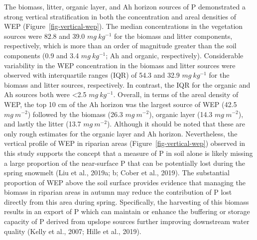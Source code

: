 \documentclass[
]{agujournal2019}
\begin{document}
The biomass, litter, organic layer, and Ah horizon sources of P
demonstrated a strong vertical stratification in both the concentration
and areal densities of WEP (Figure~\ref{fig-vertical-wep}). The median
concentrations in the vegetation sources were 82.8 and 39.0
\(mg~kg^{-1}\) for the biomass and litter components, respectively,
which is more than an order of magnitude greater than the soil
components (0.9 and 3.4 \(mg~kg^{-1}\); Ah and organic, respectively).
Considerable variability in the WEP concentration in the biomass and
litter sources were observed with interquartile ranges (IQR) of 54.3 and
32.9 \(mg~kg^{-1}\) for the biomass and litter sources, respectively. In
contrast, the IQR for the organic and Ah sources both were \textless2.5
\(mg~kg^{-1}\). Overall, in terms of the areal density of WEP, the top
10 cm of the Ah horizon was the largest source of WEP (42.5
\(mg~m^{-2}\)) followed by the biomass (26.3 \(mg~m^{-2}\)), organic
layer (14.3 \(mg~m^{-2}\)), and lastly the litter (13.7 \(mg~m^{-2}\)).
Although it should be noted that these are only rough estimates for the
organic layer and Ah horizon. Nevertheless, the vertical profile of WEP
in riparian areas (Figure~\ref{fig-vertical-wep}) observed in this study
supports the concept that a measure of P in soil alone is likely missing
a large proportion of the near-surface P that can be potentially lost
during the spring snowmelt (Liu et al., 2019a; b; Cober et al., 2019).
The substantial proportion of WEP above the soil surface provides
evidence that managing the biomass in riparian areas in autumn may
reduce the contribution of P lost directly from this area during spring.
Specifically, the harvesting of this biomass results in an export of P
which can maintain or enhance the buffering or storage capacity of P
derived from upslope sources further improving downstream water quality
(Kelly et al., 2007; Hille et al., 2019).
\end{document}
